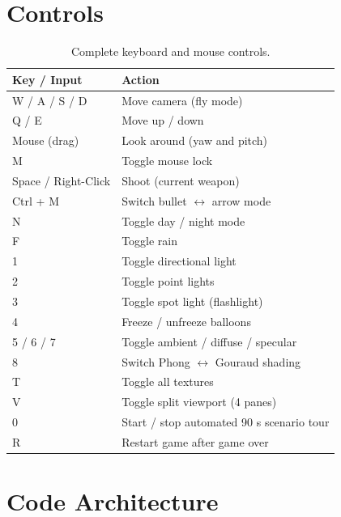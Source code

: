 \documentclass[12pt,a4paper]{article}
\begin{document}
\newpage
\section{Controls}

\begin{table}[h!]
\centering
\begin{tabular}{@{} l l @{}}
\toprule
\textbf{Key / Input} & \textbf{Action} \\
\midrule
W / A / S / D        & Move camera (fly mode) \\
Q / E                & Move up / down \\
Mouse (drag)         & Look around (yaw and pitch) \\
M                    & Toggle mouse lock \\
Space / Right-Click  & Shoot (current weapon) \\
Ctrl + M             & Switch bullet $\leftrightarrow$ arrow mode \\
N                    & Toggle day / night mode \\
F                    & Toggle rain \\
1                    & Toggle directional light \\
2                    & Toggle point lights \\
3                    & Toggle spot light (flashlight) \\
4                    & Freeze / unfreeze balloons \\
5 / 6 / 7            & Toggle ambient / diffuse / specular \\
8                    & Switch Phong $\leftrightarrow$ Gouraud shading \\
T                    & Toggle all textures \\
V                    & Toggle split viewport (4 panes) \\
0                    & Start / stop automated 90 s scenario tour \\
R                    & Restart game after game over \\
\bottomrule
\end{tabular}
\caption{Complete keyboard and mouse controls.}
\end{table}

\section{Code Architecture}
\end{document}
